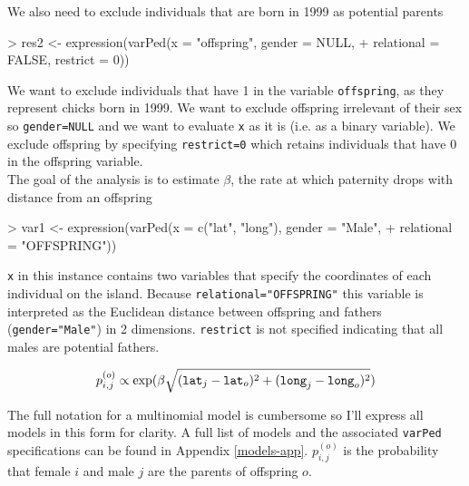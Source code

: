 \documentclass{article}
\begin{document}
We also need to exclude individuals that are born in 1999 as potential parents
 
\begin{Schunk}
\begin{Sinput}
> res2 <- expression(varPed(x = "offspring", gender = NULL, 
+     relational = FALSE, restrict = 0))
\end{Sinput}
\end{Schunk}

We want to exclude individuals that have 1 in the variable \texttt{offspring}, as they represent chicks born in 1999.  We want to exclude offspring irrelevant of their sex so  \texttt{gender=NULL}  and we want to evaluate \texttt{x} as it is (i.e. as a binary variable).  We exclude offspring by specifying \texttt{restrict=0} which retains individuals that have 0 in the offspring variable.\\

The goal of the analysis is to estimate $\beta$, the rate at which paternity drops with distance from an offspring

\begin{Schunk}
\begin{Sinput}
> var1 <- expression(varPed(x = c("lat", "long"), gender = "Male", 
+     relational = "OFFSPRING"))
\end{Sinput}
\end{Schunk}

\texttt{x} in this instance contains two variables that specify the coordinates of each individual on the island. Because \texttt{relational="OFFSPRING"} this variable is interpreted as the Euclidean distance between offspring and fathers (\texttt{gender="Male"}) in 2 dimensions.  \texttt{restrict} is not specified indicating that all males are potential fathers. 

\begin{equation}
p^{(o)}_{i,j} \propto \textrm{exp}(\beta \sqrt{(\textrm{\texttt{lat}}_{j}-\textrm{\texttt{lat}}_{o})^{2}+(\textrm{\texttt{long}}_{j}-\textrm{\texttt{long}}_{o})^{2}})
\label{dist-eq}
\end{equation}

The full notation for a multinomial model is cumbersome so I'll express all models in this form for clarity. A full list of models and the associated \texttt{varPed} specifications can be found in Appendix \ref{models-app}. $p^{(o)}_{i,j}$ is the probability that female $i$ and male $j$ are the parents of offspring $o$.\\  
\end{document}
